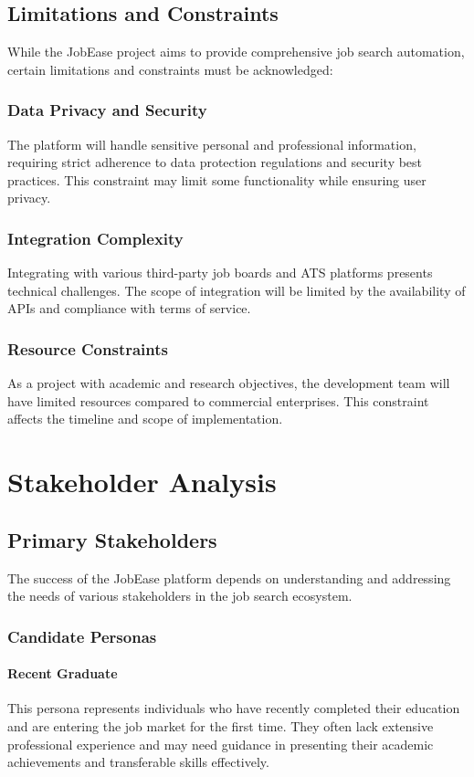 \documentclass[12pt,a4paper]{report}
\begin{document}
\section{Limitations and Constraints}
While the JobEase project aims to provide comprehensive job search automation, certain limitations and constraints must be acknowledged:

\subsection{Data Privacy and Security}
The platform will handle sensitive personal and professional information, requiring strict adherence to data protection regulations and security best practices. This constraint may limit some functionality while ensuring user privacy.

\subsection{Integration Complexity}
Integrating with various third-party job boards and ATS platforms presents technical challenges. The scope of integration will be limited by the availability of APIs and compliance with terms of service.

\subsection{Resource Constraints}
As a project with academic and research objectives, the development team will have limited resources compared to commercial enterprises. This constraint affects the timeline and scope of implementation.

\chapter{Stakeholder Analysis}

\section{Primary Stakeholders}
The success of the JobEase platform depends on understanding and addressing the needs of various stakeholders in the job search ecosystem.

\subsection{Candidate Personas}
\subsubsection{Recent Graduate}
This persona represents individuals who have recently completed their education and are entering the job market for the first time. They often lack extensive professional experience and may need guidance in presenting their academic achievements and transferable skills effectively.
\end{document}
